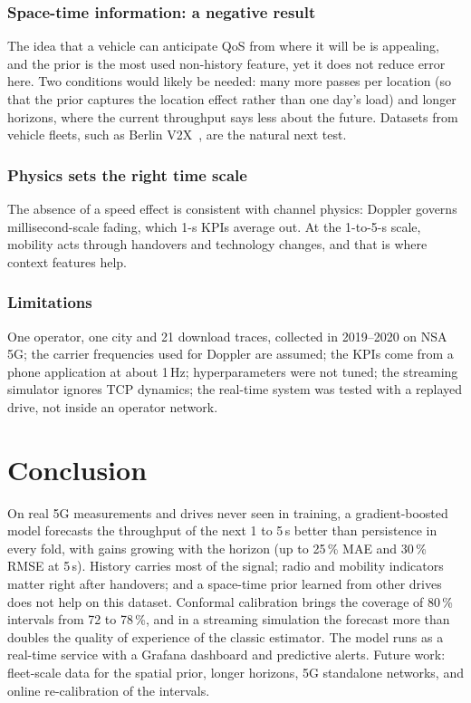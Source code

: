 \documentclass[10pt,a4paper,twocolumn]{article}
\begin{document}
\subsubsection{Space-time information: a negative result}
The idea that a vehicle can anticipate QoS from where it will be is appealing, and the
prior is the most used non-history feature, yet it does not reduce error here. Two
conditions would likely be needed: many more passes per location (so that the prior
captures the location effect rather than one day's load) and longer horizons, where the
current throughput says less about the future. Datasets from vehicle fleets, such as Berlin
V2X~\cite{berlinv2x}, are the natural next test.

\subsubsection{Physics sets the right time scale}
The absence of a speed effect is consistent with channel physics: Doppler governs
millisecond-scale fading, which 1-s KPIs average out. At the 1-to-5-s scale, mobility acts
through handovers and technology changes, and that is where context features help.

\subsubsection{Limitations}
One operator, one city and 21 download traces, collected in 2019--2020 on NSA 5G; the
carrier frequencies used for Doppler are assumed; the KPIs come from a phone application at
about 1\,Hz; hyperparameters were not tuned; the streaming simulator ignores TCP dynamics;
the real-time system was tested with a replayed drive, not inside an operator network.

\section{Conclusion}
\label{sec:conclusion}
On real 5G measurements and drives never seen in training, a gradient-boosted model
forecasts the throughput of the next 1 to 5\,s better than persistence in every fold, with
gains growing with the horizon (up to 25\,\% MAE and 30\,\% RMSE at 5\,s). History carries
most of the signal; radio and mobility indicators matter right after handovers; and a
space-time prior learned from other drives does not help on this dataset. Conformal
calibration brings the coverage of 80\,\% intervals from 72 to 78\,\%, and in a streaming
simulation the forecast more than doubles the quality of experience of the classic
estimator. The model runs as a real-time service with a Grafana dashboard and predictive
alerts. Future work: fleet-scale data for the spatial prior, longer horizons, 5G
standalone networks, and online re-calibration of the intervals.
\end{document}
